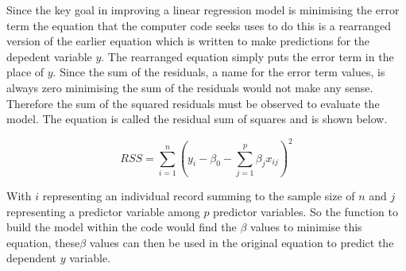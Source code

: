 \documentclass[11pt]{article}
\begin{document}
Since the key goal in improving a linear regression model is minimising the error term the equation that the computer code seeks uses to do this is a rearranged version of the earlier equation which is written to make predictions for the depedent variable \(y\). The rearranged equation simply puts the error term in the place of \(y\).  Since the sum of the residuals, a name for the error term values, is always zero minimising the sum of the residuals would not make any sense. Therefore the sum of the squared residuals must be observed to evaluate the model.  The equation is called the residual sum of squares and is shown below.

\[RSS = \sum_{i=1}^{n}(y_i - \beta_0 - \sum_{j=1}^{p}\beta_jx_{ij})^2\]

With \(i\) representing an individual record summing to the sample size of \(n\) and \(j\) representing a predictor variable among \(p\) predictor variables. So the function to build the model within the code would find the  \(\beta\) values to minimise this equation, these\(\beta\) values can then be used in the original equation to predict the dependent \(y\) variable.






\end{document}
